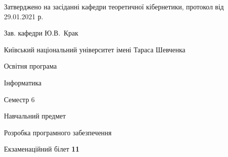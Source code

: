 \documentclass[10pt, ukrainian]{article}
\begin{document}
{\vspace{5mm}\smallskip \begin {small} Затверджено на засіданні кафедри теоретичної кібернетики, протокол  від   29.01.2021 р.\par\smallskip\smallskip
{\parbox {6.5 cm}{Зав. кафедри \dotfill Ю.В.~Крак}} \end{small}}
\newpage

{{\begin {small}\par
{ \center  Київський національний університет імені Тараса Шевченка \par}
{\parbox {5 cm}{Освітня програма \hfill}{\parbox {7 cm}{Інформатика \hfill}}\parbox {6 cm}{\hfill Семестр 6}}\par
{\parbox {5 cm} {Навчальний предмет \hfill}\parbox {7 cm}{Розробка програмного забезпечення \hfill}\parbox {6cm}{\hfill}\par}\vspace{-7pt} \end{small}}{\center Екзаменаційний білет \No \textbf
{ 11 }\par}}
\end{document}
